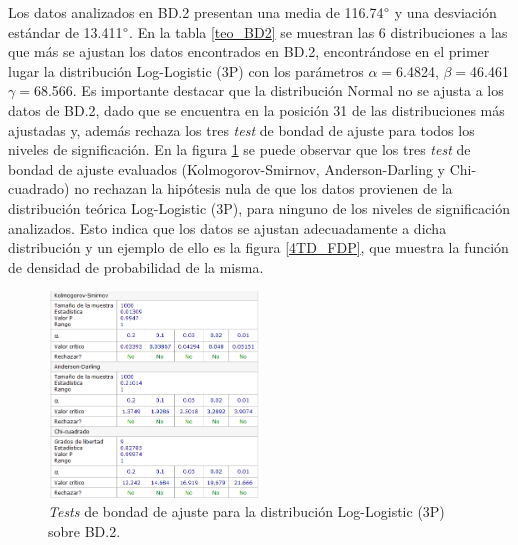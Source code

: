 \documentclass[12pt]{report}
\begin{document}
Los datos analizados en BD.2 presentan una media de 116.74$\degree$ y una desviación estándar de 13.411$\degree$.
En la tabla \ref{teo_BD2}  se muestran las 6 distribuciones a las que más se ajustan los datos encontrados en BD.2, encontrándose en el primer lugar la distribución Log-Logistic (3P) con los parámetros $\alpha=$6.4824, $\beta=$46.461 $\gamma=$68.566. Es importante destacar que la distribución Normal no se ajusta a los datos de BD.2, dado que se encuentra en la posición 31 de las distribuciones más ajustadas y, además rechaza los tres \textit{test} de bondad de ajuste para todos los niveles de significación. En la figura \ref{4TD_BONDAD} se puede observar que los tres \textit{test} de bondad de ajuste evaluados (Kolmogorov-Smirnov, Anderson-Darling y Chi-cuadrado) no rechazan la hipótesis nula de que los datos provienen de la distribución teórica Log-Logistic (3P), para ninguno de los niveles de significación analizados. Esto indica que los datos se ajustan adecuadamente a dicha distribución y un ejemplo de ello es la figura \ref{4TD_FDP}, que muestra la función de densidad de probabilidad de la misma. 
\begin{figure}[ht]
	\centering
	
	\includegraphics[width=0.5\textwidth]{4td_bondad.png}
	\caption{\textit{Tests} de bondad de ajuste para la distribución Log-Logistic (3P) sobre BD.2.}
	\label{4TD_BONDAD}
\end{figure}




\end{document}
